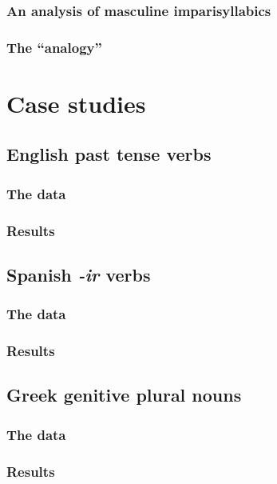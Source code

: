 \documentclass{upenndiss}
\begin{document}
\subsubsection{An analysis of masculine imparisyllabics}

\subsubsection{The ``analogy''}

\section{Case studies}

\subsection{English past tense verbs}

\subsubsection{The data}

\subsubsection{Results}

\subsection{Spanish \emph{-ir} verbs}

\subsubsection{The data}

\subsubsection{Results}

\subsection{Greek genitive plural nouns}

\subsubsection{The data}

\subsubsection{Results}
\end{document}
